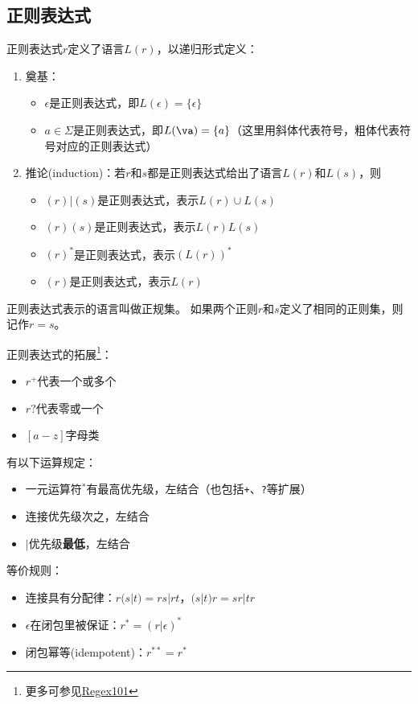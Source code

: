 \subsection{正则表达式}
\begin{definition}
正则表达式$r$定义了语言$L(r)$，以递归形式定义：
\begin{enumerate}
	\item 奠基：
	\begin{itemize}
		\item $\epsilon$是正则表达式，即$L(\epsilon)=\{\epsilon\}$
		\item $a\in\Sigma$是正则表达式，即$L(\va)=\{a\}$（这里用斜体代表符号，粗体代表符号对应的正则表达式）
	\end{itemize}
	\item 推论(induction)：若$r$和$s$都是正则表达式给出了语言$L(r)$和$L(s)$，则
	\begin{itemize}
		\item $(r)|(s)$是正则表达式，表示$L(r)\cup L(s)$
		\item $(r)(s)$是正则表达式，表示$L(r)L(s)$
		\item $(r)^*$是正则表达式，表示$(L(r))^*$
		\item $(r)$是正则表达式，表示$L(r)$
	\end{itemize}
\end{enumerate}
正则表达式表示的语言叫做正规集。
如果两个正则$r$和$s$定义了相同的正则集，则记作$r=s$。
\end{definition}

正则表达式的拓展\footnote{更多可参见\href{https://regex101.com/}{Regex101}}：
\begin{itemize}
	\item $r^+$代表一个或多个
	\item $r?$代表零或一个
	\item $[a-z]$字母类
\end{itemize}

有以下运算规定：
\begin{itemize}
	\item 一元运算符${}^*$有最高优先级，左结合（也包括\verb'+'、\verb'?'等扩展）
	\item 连接优先级次之，左结合
	\item $|$优先级\textbf{最低}，左结合
\end{itemize}

等价规则：
\begin{itemize}
	\item 连接具有分配律：$r(s|t)=rs|rt$，$(s|t)r=sr|tr$
	\item $\epsilon$在闭包里被保证：$r^*=(r|\epsilon)^*$
	\item 闭包幂等(idempotent)：$r^{**}=r^*$
\end{itemize}

